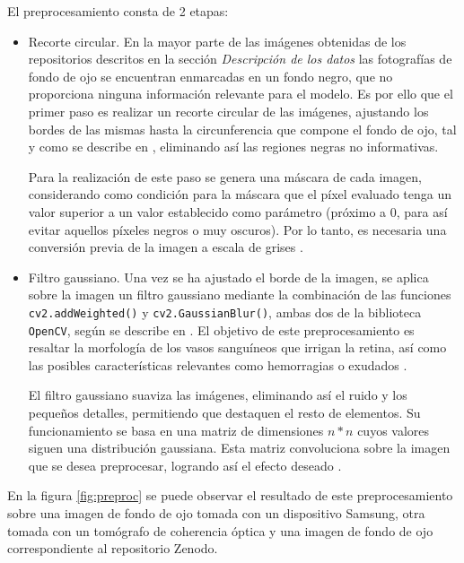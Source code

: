 El preprocesamiento consta de 2 etapas:

\begin{itemize}[itemsep=0.25em]
    \item Recorte circular. En la mayor parte de las imágenes obtenidas de los repositorios descritos en la sección \textit{Descripción de los datos} las fotografías de fondo de ojo se encuentran enmarcadas en un fondo negro, que no proporciona ninguna información relevante para el modelo. Es por ello que el primer paso es realizar un recorte circular de las imágenes, ajustando los bordes de las mismas hasta la circunferencia que compone el fondo de ojo, tal y como se describe en \cite{preproc:kaggle}, eliminando así las regiones negras no informativas.

    Para la realización de este paso se genera una máscara de cada imagen, considerando como condición para la máscara que el píxel evaluado tenga un valor superior a un valor establecido como parámetro (próximo a 0, para así evitar aquellos píxeles negros o muy oscuros). Por lo tanto, es necesaria una conversión previa de la imagen a escala de grises \cite{preproc:kaggle}.
    
    \item Filtro gaussiano. Una vez se ha ajustado el borde de la imagen, se aplica sobre la imagen un filtro gaussiano mediante la combinación de las funciones \texttt{cv2.addWeighted()} y \texttt{cv2.GaussianBlur()}, ambas dos de la biblioteca \texttt{OpenCV}, según se describe en \cite{preproc:kaggle}. El objetivo de este preprocesamiento es resaltar la morfología de los vasos sanguíneos que irrigan la retina, así como las posibles características relevantes como hemorragias o exudados \cite{preproc:maison}. 

    El filtro gaussiano suaviza las imágenes, eliminando así el ruido y los pequeños detalles, permitiendo que destaquen el resto de elementos. Su funcionamiento se basa en una matriz de dimensiones $n*n$ cuyos valores siguen una distribución gaussiana. Esta matriz convoluciona sobre la imagen que se desea preprocesar, logrando así el efecto deseado \cite{preproc:ieee}.
\end{itemize}

En la figura \ref{fig:preproc} se puede observar el resultado de este preprocesamiento sobre una imagen de fondo de ojo tomada con un dispositivo Samsung, otra tomada con un tomógrafo de coherencia óptica y una imagen de fondo de ojo correspondiente al repositorio Zenodo.

